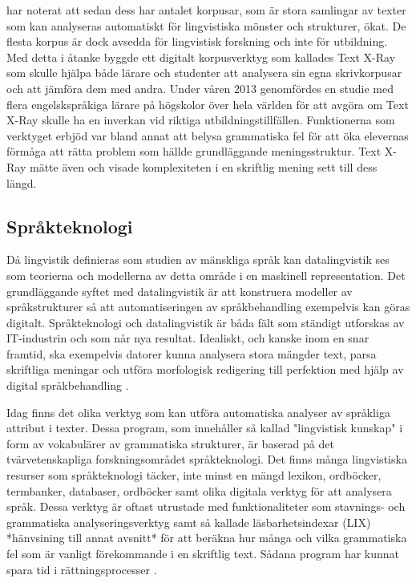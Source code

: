 \documentclass[swedish]{maucsthesis}
\begin{document}
\cite{zhu:2015} har noterat att sedan dess har antalet korpusar, som är stora
samlingar av texter som kan analyseras automatiskt för lingvistiska mönster och
strukturer, ökat. De flesta korpus är dock avsedda för lingvistisk forskning och
inte för utbildning. Med detta i åtanke byggde \citeauthor{zhu:2015} ett
digitalt korpusverktyg som kallades Text X-Ray som skulle hjälpa både lärare och
studenter att analysera sin egna skrivkorpusar och att jämföra dem med andra.
Under våren 2013 genomfördes en studie med flera engelskspråkiga lärare på
högskolor över hela världen för att avgöra om Text X-Ray skulle ha en inverkan
vid riktiga utbildningstillfällen. Funktionerna som verktyget erbjöd var bland
annat att belysa grammatiska fel för att öka elevernas förmåga att rätta problem
som hällde grundläggande meningsstruktur. Text X-Ray mätte även och visade
komplexiteten i en skriftlig mening sett till dess längd.

\subsection{Språkteknologi}

Då lingvistik definieras som studien av mänskliga språk kan datalingvistik ses
som teorierna och modellerna av detta område i en maskinell representation. Det
grundläggande syftet med datalingvistik är att konstruera modeller av
språkstrukturer så att automatiseringen av språkbehandling exempelvis kan göras
digitalt. Språkteknologi och datalingvistik är båda fält som ständigt utforskas
av IT-industrin och som når nya resultat. Idealiskt, och kanske inom en snar
framtid, ska exempelvis datorer kunna analysera stora mängder text, parsa
skriftliga meningar och utföra morfologisk redigering till perfektion med hjälp
av digital språkbehandling \citep{nugues:2014}.

Idag finns det olika verktyg som kan utföra automatiska analyser av språkliga
attribut i texter. Dessa program, som innehåller så kallad "lingvistisk kunskap"
i form av vokabulärer av grammatiska strukturer, är baserad på det
tvärvetenskapliga forskningsområdet språkteknologi. Det finns många lingvistiska
resurser som språkteknologi täcker, inte minst en mängd lexikon, ordböcker,
termbanker, databaser, ordböcker samt olika digitala verktyg för att analysera
språk. Dessa verktyg är oftast utrustade med funktionaliteter som stavnings- och
grammatiska analyseringsverktyg samt så kallade läsbarhetsindexar (LIX)
*hänvsining till annat avsnitt* för att beräkna hur många och vilka grammatiska
fel som är vanligt förekommande i en skriftlig text. Sådana program har kunnat
spara tid i rättningsprocesser \citep{wengelin:2017}.
\end{document}
